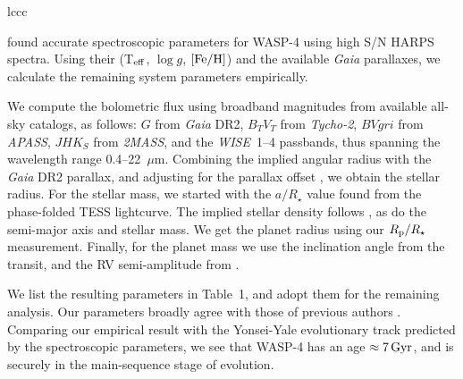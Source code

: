 \documentclass[12pt,twocolumn,tighten]{aastex62}
\begin{document}
\begin{deluxetable}{lccc}

\end{deluxetable}

\citet{doyle_accurate_2013} found accurate spectroscopic parameters
for WASP-4 using high S/N HARPS spectra.  Using their (T$_{\rm eff}$,
$\log g$, $[{\rm Fe/H}]$) and the available {\it Gaia} parallaxes, we
calculate the remaining system parameters empirically.

We compute the bolometric flux using broadband magnitudes from
available all-sky catalogs, as follows: $G$ from {\it Gaia\/} DR2,
$B_T V_T$ from {\it Tycho-2}, $BVgri$ from {\it APASS}, $JHK_S$ from {\it
2MASS}, and the {\it WISE}~1--4 passbands, thus spanning the
wavelength range 0.4--22~$\mu$m.  Combining the implied angular radius
with the {\it Gaia} DR2 parallax, and adjusting for the parallax
offset \citep{stassun_evidence_2018}, we obtain the stellar radius.
For the stellar mass, we started with the $a/R_\star$ value found from
the phase-folded TESS lightcurve.  The implied stellar density follows
\citep{seager_unique_2003}, as do the
semi-major axis and stellar mass.  We get the planet radius using our
$R_{\rm p}/R_\star$ measurement.  Finally, for the planet mass we use the
inclination angle from the transit, and the RV semi-amplitude from 
\citet{triaud_spin-orbit_2010}.

We list the resulting parameters in Table~1, and adopt them for the
remaining analysis.  Our parameters broadly agree with those of previous
authors
\citep{wilson_wasp-4b_2008,gillon_discovery_2009,winn_transit_2009,southworth_homogeneous_2011,petrucci_no_2013}.
Comparing our empirical result with the Yonsei-Yale evolutionary track
predicted by the spectroscopic parameters, we see that WASP-4 has an
age $\approx 7\,{\rm Gyr}$, and is securely in the main-sequence stage
of evolution.
\end{document}
